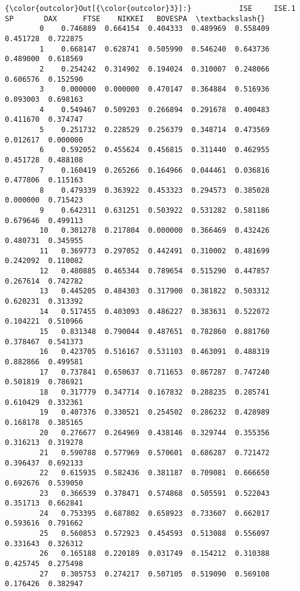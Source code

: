\documentclass[11pt]{article}
\begin{document}
\begin{Verbatim}[commandchars=\\\{\}]
{\color{outcolor}Out[{\color{outcolor}3}]:}           ISE     ISE.1        SP       DAX      FTSE    NIKKEI   BOVESPA  \textbackslash{}
        0    0.746889  0.664154  0.404333  0.489969  0.558409  0.451728  0.722875   
        1    0.668147  0.628741  0.505990  0.546240  0.643736  0.489000  0.618569   
        2    0.254242  0.314902  0.194024  0.310007  0.248066  0.606576  0.152590   
        3    0.000000  0.000000  0.470147  0.364884  0.516936  0.093003  0.698163   
        4    0.549467  0.509203  0.266894  0.291678  0.400483  0.411670  0.374747   
        5    0.251732  0.228529  0.256379  0.348714  0.473569  0.012617  0.000000   
        6    0.592052  0.455624  0.456815  0.311440  0.462955  0.451728  0.488108   
        7    0.160419  0.265266  0.164966  0.044461  0.036816  0.477806  0.115163   
        8    0.479339  0.363922  0.453323  0.294573  0.385028  0.000000  0.715423   
        9    0.642311  0.631251  0.503922  0.531282  0.581186  0.679646  0.499113   
        10   0.301278  0.217804  0.000000  0.366469  0.432426  0.480731  0.345955   
        11   0.369773  0.297052  0.442491  0.310002  0.481699  0.242092  0.110082   
        12   0.480885  0.465344  0.789654  0.515290  0.447857  0.267614  0.742782   
        13   0.445205  0.484303  0.317900  0.381822  0.503312  0.620231  0.313392   
        14   0.517455  0.403093  0.486227  0.383631  0.522072  0.104221  0.510966   
        15   0.831348  0.790044  0.487651  0.782860  0.881760  0.378467  0.541373   
        16   0.423705  0.516167  0.531103  0.463091  0.488319  0.882866  0.499581   
        17   0.737841  0.650637  0.711653  0.867287  0.747240  0.501819  0.786921   
        18   0.317779  0.347714  0.167832  0.288235  0.285741  0.610429  0.332361   
        19   0.407376  0.330521  0.254502  0.286232  0.428989  0.168178  0.385165   
        20   0.276677  0.264969  0.438146  0.329744  0.355356  0.316213  0.319278   
        21   0.590788  0.577969  0.570601  0.686287  0.721472  0.396437  0.692133   
        22   0.615935  0.582436  0.381187  0.709081  0.666650  0.692676  0.539050   
        23   0.366539  0.378471  0.574868  0.505591  0.522043  0.351713  0.662841   
        24   0.753395  0.687802  0.658923  0.733607  0.662017  0.593616  0.791662   
        25   0.560853  0.572923  0.454593  0.513088  0.556097  0.331643  0.326312   
        26   0.165188  0.220189  0.031749  0.154212  0.310388  0.425745  0.275498   
        27   0.305753  0.274217  0.507105  0.519090  0.569108  0.176426  0.382947   

\end{Verbatim}
\end{document}
